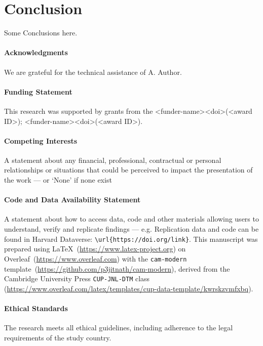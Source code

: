 \documentclass[journal=eds]{CAM-MODERN}%
\theoremstyle{definition}
\numberwithin{equation}{section}
\begin{document}
\section{Conclusion}

Some Conclusions here.



\begin{Backmatter}



\paragraph{Acknowledgments}
We are grateful for the technical assistance of A. Author.

\paragraph{Funding Statement}
This research was supported by grants from the <funder-name><doi>(<award ID>); <funder-name><doi>(<award ID>).

\paragraph{Competing Interests}
A statement about any financial, professional, contractual or personal relationships or situations that could be perceived to impact the presentation of the work --- or `None' if none exist

\paragraph{Code and Data Availability Statement}
A statement about how to access data, code and other materials allowing users to understand, verify and replicate findings --- e.g. Replication data and code can be found in Harvard Dataverse: \verb+\url{https://doi.org/link}+. %
This manuscript was prepared using \LaTeX~(\url{https://www.latex-project.org}) on Overleaf~(\url{https://www.overleaf.com}) with the \texttt{cam-modern} template~(\url{https://github.com/p3jitnath/cam-modern}), derived from the Cambridge University Press \texttt{CUP-JNL-DTM} class (\url{https://www.overleaf.com/latex/templates/cup-data-template/kwrskzvmfxbq}).

\paragraph{Ethical Standards}
The research meets all ethical guidelines, including adherence to the legal requirements of the study country.


\end{Backmatter}
\end{document}
